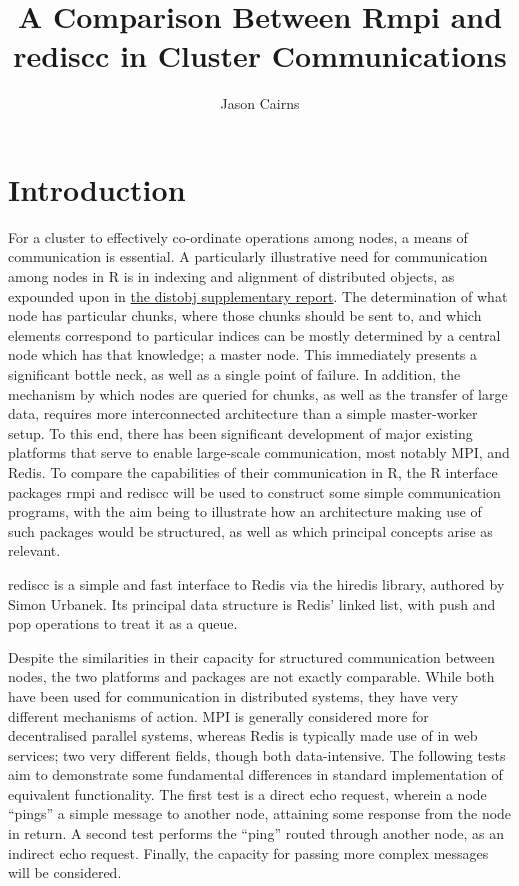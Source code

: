 \documentclass[10pt,a4paper]{article}
\begin{document}
\title{A Comparison Between Rmpi and rediscc in Cluster Communications}
\author{Jason Cairns}
  
\maketitle{}

\section{Introduction}
For a cluster to effectively co-ordinate operations among nodes, a means of communication is essential.
A particularly illustrative need for communication among nodes in R is in indexing and alignment of distributed objects, as expounded upon in \href{experiment-eager-dist-obj-supp.pdf}{the distobj supplementary report}.
The determination of what node has particular chunks, where those chunks should be sent to, and which elements correspond to particular indices can be mostly determined by a central node which has that knowledge; a master node.
This immediately presents a significant bottle neck, as well as a single point of failure.
In addition, the mechanism by which nodes are queried for chunks, as well as the transfer of large data, requires more interconnected architecture than a simple master-worker setup.
To this end, there has been significant development of major existing platforms that serve to enable large-scale communication, most notably MPI, and Redis\cite{walker1996mpi}\cite{sanfilippo2009redis}.
To compare the capabilities of their communication in R, the R interface packages rmpi and rediscc will be used to construct some simple communication programs, with the aim being to illustrate how an architecture making use of such packages would be structured, as well as which principal concepts arise as relevant\cite{yu02:_rmpi}\cite{urbanek2020rediscc}.

rediscc is a simple and fast interface to Redis via the hiredis library, authored by Simon Urbanek.
Its principal data structure is Redis' linked list, with push and pop operations to treat it as a queue.

Despite the similarities in their capacity for structured communication between nodes, the two platforms and packages are not exactly comparable.
While both have been used for communication in distributed systems, they have very different mechanisms of action\cite{li2017redis}\cite{gropp1999mpi}\cite{carlson2013redis}.
MPI is generally considered more for decentralised parallel systems, whereas Redis is typically made use of in web services; two very different fields, though both data-intensive\cite{kleppmann2017dataintensive}.
The following tests aim to demonstrate some fundamental differences in standard implementation of equivalent functionality. 
The first test is a direct echo request, wherein a node ``pings'' a simple message to another node, attaining some response from the node in return.
A second test performs the ``ping'' routed through another node, as an indirect echo request.
Finally, the capacity for passing more complex messages will be considered.
\end{document}
